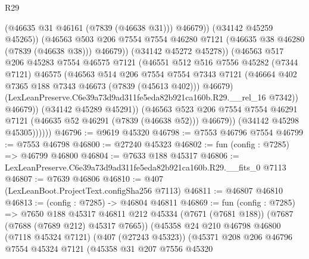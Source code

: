\begin{lexlean}{R29}
\begin{coremodule}
                              (@46635 @31 @46161 (@7839 (@46638 @31)))
                              @46679))
                          (@34142 @45259 @45265))
                        (@46563
                          @503
                          @206
                          @7554
                          @7554
                          @46280
                          @7121
                          (@46635 @38 @46280 (@7839 (@46638 @38)))
                          @46679))
                      (@34142 @45272 @45278))
                    (@46563
                      @517
                      @206
                      @45283
                      @7554
                      @46575
                      @7121
                      (@46551
                        @512
                        @516
                        @7556
                        @45282
                        (@7344 @7121)
                        @46575
                        (@46563
                          @514
                          @206
                          @7554
                          @7554
                          @7343
                          @7121
                          (@46664 @402 @7365 @188 @7343 @46673 (@7839 (@45613 @402)))
                          @46679)
                        (LexLeanPreserve.C6e39a73d9ad311fe5eda82b921ca160b.R29.__rel_16 @7342))
                      @46679))
                  (@34142 @45289 @45291))
                (@46563
                  @523
                  @206
                  @7554
                  @7554
                  @46291
                  @7121
                  (@46635 @52 @46291 (@7839 (@46638 @52)))
                  @46679))
              (@34142 @45298 @45305))))))
@46796 := @9619 @45320
@46798 := @7553 @46796 @7554
@46799 := @7553 @46798
@46800 := @27240 @45323
@46802 := fun (config : @7285) => @46799 @46800
@46804 := @7633 @188 @45317
@46806 := LexLeanPreserve.C6e39a73d9ad311fe5eda82b921ca160b.R29.__fits_0 @7113
@46807 := @7639 @46806
@46810 := @407 (LexLeanBoot.ProjectText.configSha256 @7113)
@46811 := @46807 @46810
@46813 := (config : @7285) -> @46804 @46811
@46869 := fun (config : @7285) =>
  @7650
    @188
    @45317
    @46811
    @212
    @45334
    (@7671 (@7681 @188))
    (@7687 (@7688 (@7689 @212) @45317 @7665))
    (@45358
      @24
      @210
      @46798
      @46800
      (@7118 @45324 @7121)
      (@407 (@27243 @45323))
      (@45371
        @208
        @206
        @46796
        @7554
        @45324
        @7121
        (@45358
          @31
          @207
          @7556
          @45320

\end{coremodule}
\end{lexlean}
